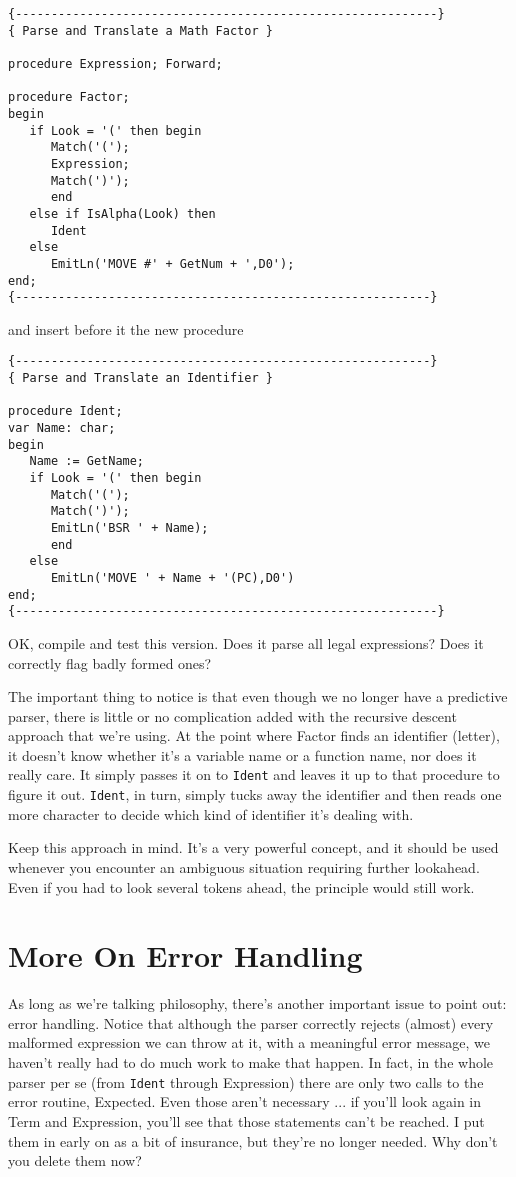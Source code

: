 \begin{verbatim}
{-----------------------------------------------------------}
{ Parse and Translate a Math Factor }

procedure Expression; Forward;

procedure Factor;
begin
   if Look = '(' then begin
      Match('(');
      Expression;
      Match(')');
      end
   else if IsAlpha(Look) then
      Ident
   else
      EmitLn('MOVE #' + GetNum + ',D0');
end;
{----------------------------------------------------------}
\end{verbatim}

and insert before it the new procedure

\begin{verbatim}
{----------------------------------------------------------}
{ Parse and Translate an Identifier }

procedure Ident;
var Name: char;
begin
   Name := GetName;
   if Look = '(' then begin
      Match('(');
      Match(')');
      EmitLn('BSR ' + Name);
      end
   else
      EmitLn('MOVE ' + Name + '(PC),D0')
end;
{-----------------------------------------------------------}
\end{verbatim}

OK, compile and  test  this  version. Does  it  parse  all legal expressions?  Does it correctly flag badly formed ones?

The important thing to notice is that even though  we  no  longer have  a predictive parser, there is  little  or  no  complication added with the recursive descent approach that we're  using. At the point where  Factor  finds an identifier (letter), it doesn't know whether it's a variable name or a function name, nor does it really care. It simply passes it on to {\tt Ident} and leaves it up to that procedure to figure it out. {\tt Ident}, in  turn, simply  tucks away the identifier and then reads one more  character  to decide which kind of identifier it's dealing with.

Keep this approach in mind. It's a very powerful concept, and it should be used  whenever  you  encounter  an  ambiguous situation requiring further lookahead. Even  if  you  had to look several tokens ahead, the principle would still work.

\section{More On Error Handling}

As long as we're talking  philosophy, there's  another important issue to point out:  error  handling. Notice that although the parser correctly rejects (almost)  every malformed  expression we can  throw at it, with a meaningful  error  message, we  haven't really had to  do much work to make that happen. In fact, in the whole parser per se (from {\tt Ident} through  Expression)  there are only two calls to the error routine, Expected. Even those aren't necessary ... if you'll look again in Term and Expression, you'll see that those statements can't be reached. I put them  in early on as a  bit  of  insurance, but  they're no longer needed. Why don't you delete them now?


